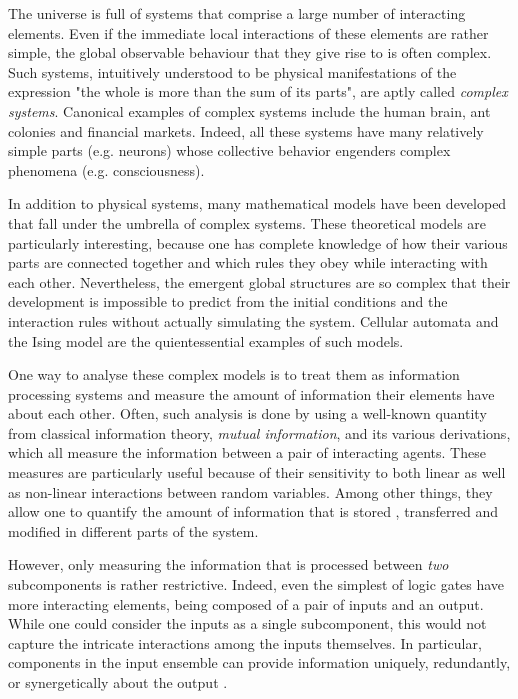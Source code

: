 \documentclass[12pt]{article}
\begin{document}

The universe is full of systems that comprise a large number of interacting elements. Even if the immediate local interactions of these elements are rather simple, the global observable behaviour that they give rise to is often complex. Such systems, intuitively understood to be physical manifestations of the expression "the whole is more than the sum of its parts", are aptly called \textit{complex systems}. Canonical examples of complex systems include the human brain, ant colonies and financial markets. Indeed, all these systems have many relatively simple parts (e.g. neurons) whose collective behavior engenders complex phenomena (e.g. consciousness). 

In addition to physical systems, many mathematical models have been developed that fall under the umbrella of complex systems. These theoretical models are particularly interesting, because one has complete knowledge of how their various parts are connected together and which rules they obey while interacting with each other. Nevertheless, the emergent global structures are so complex that their development is impossible to predict from the initial conditions and the interaction rules without actually simulating the system. Cellular automata and the Ising model are the quientessential examples of such models.

One way to analyse these complex models is to treat them as information processing systems and measure the amount of information their elements have about each other. Often, such analysis is done by using a well-known quantity from classical information theory, \textit{mutual information}, and its various derivations, which all measure the information between a pair of interacting agents. These measures are particularly useful because of their sensitivity to both linear as well as non-linear interactions between random variables. Among other things, they allow one to quantify the amount of information that is stored \cite{active-inf-storage}, transferred \cite{transfer-entropy} and modified \cite{inf-modification} in different parts of the system.

However, only measuring the information that is processed between \textit{two} subcomponents is rather restrictive. Indeed, even the simplest of logic gates have more interacting elements, being composed of a pair of inputs and an output. While one could consider the inputs as a single subcomponent, this would not capture the intricate interactions among the inputs themselves. In particular, components in the input ensemble can provide information uniquely, redundantly, or synergetically about the output \cite{williams-beer}.  
\end{document}
